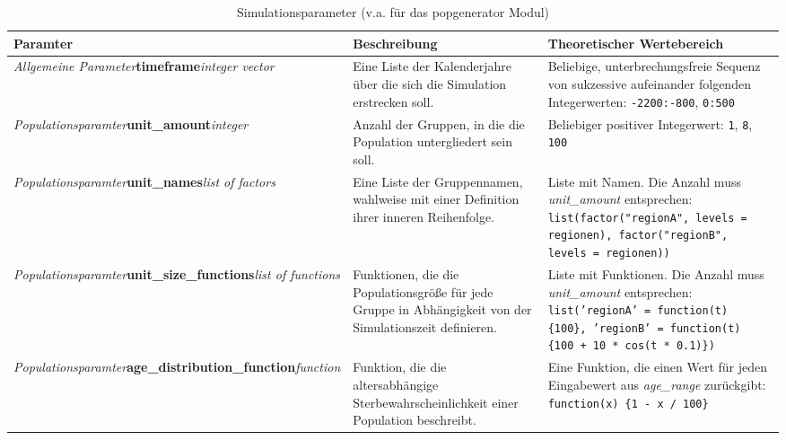 \documentclass[openany,twoside,twocolumn]{book}
\begin{document}
\begin{table*}

\caption{\label{tab:param-popgenerator}Simulationsparameter (v.a. für das popgenerator Modul)}
\centering
\fontsize{8}{10}\selectfont
\begin{tabu} to 
\toprule
Paramter & Beschreibung & Theoretischer Wertebereich\\
\midrule
\textit{Allgemeine Parameter}\newline \textbf{timeframe}\newline \textit{integer vector} & Eine Liste der Kalenderjahre über die sich die Simulation erstrecken soll. & Beliebige, unterbrechungsfreie Sequenz von sukzessive aufeinander folgenden Integerwerten: \texttt{-2200:-800}, \texttt{0:500}\\
\addlinespace \hline \addlinespace
\textit{Populationsparamter}\newline \textbf{unit\_amount}\newline \textit{integer} & Anzahl der Gruppen, in die die Population untergliedert sein soll. & Beliebiger positiver Integerwert: \newline     \texttt{1}, \texttt{8}, \texttt{100}\\
\addlinespace \hline \addlinespace
\textit{Populationsparamter}\newline \textbf{unit\_names}\newline \textit{list of factors} & Eine Liste der Gruppennamen, wahlweise mit einer Definition ihrer inneren Reihenfolge. & Liste mit Namen. Die Anzahl muss \textit{unit\_amount} entsprechen: \newline     \texttt{list(factor("regionA", levels = regionen), factor("regionB", levels = regionen))}\\
\addlinespace \hline \addlinespace
\textit{Populationsparamter}\newline \textbf{unit\_size\_functions}\newline \textit{list of functions} & Funktionen, die die Populationsgröße für jede Gruppe in Abhängigkeit von der Simulationszeit definieren. & Liste mit Funktionen. Die Anzahl muss \textit{unit\_amount} entsprechen: \newline     \texttt{list('regionA' = function(t) \{100\}, 'regionB' = function(t) \{100 + 10 * cos(t * 0.1)\})}\\
\addlinespace \hline \addlinespace
\textit{Populationsparamter}\newline \textbf{age\_distribution\_function}\newline \textit{function} & Funktion, die die altersabhängige Sterbewahrscheinlichkeit einer Population beschreibt. & Eine Funktion, die einen Wert für jeden Eingabewert aus \textit{age\_range} zurückgibt: \newline     \texttt{function(x) \{1 - x / 100\}}\\

\end{tabu}
\end{table*}
\end{document}
